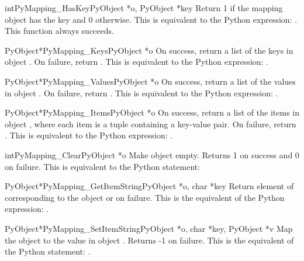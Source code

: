      \begin{cfuncdesc}{int}{PyMapping_HasKey}{PyObject *o, PyObject *key}
	 Return 1 if the mapping object has the key 
	 and 0 otherwise.  This is equivalent to the Python expression:
	 . 
	 This function always succeeds.
     \end{cfuncdesc}


     \begin{cfuncdesc}{PyObject*}{PyMapping_Keys}{PyObject *o}
         On success, return a list of the keys in object .  On
	 failure, return {\NULL}. This is equivalent to the Python
	 expression: .
     \end{cfuncdesc}


     \begin{cfuncdesc}{PyObject*}{PyMapping_Values}{PyObject *o}
         On success, return a list of the values in object .  On
	 failure, return {\NULL}. This is equivalent to the Python
	 expression: .
     \end{cfuncdesc}


     \begin{cfuncdesc}{PyObject*}{PyMapping_Items}{PyObject *o}
         On success, return a list of the items in object , where
	 each item is a tuple containing a key-value pair.  On
	 failure, return {\NULL}. This is equivalent to the Python
	 expression: .
     \end{cfuncdesc}

     \begin{cfuncdesc}{int}{PyMapping_Clear}{PyObject *o}
         Make object  empty.  Returns 1 on success and 0 on failure.
	 This is equivalent to the Python statement:
     \end{cfuncdesc}


     \begin{cfuncdesc}{PyObject*}{PyMapping_GetItemString}{PyObject *o, char *key}
	 Return element of  corresponding to the object  or {\NULL}
	 on failure. This is the equivalent of the Python expression:
	 .
     \end{cfuncdesc}

     \begin{cfuncdesc}{PyObject*}{PyMapping_SetItemString}{PyObject *o, char *key, PyObject *v}
         Map the object  to the value  in object .  Returns 
         -1 on failure.  This is the equivalent of the Python
         statement: .
     \end{cfuncdesc}


